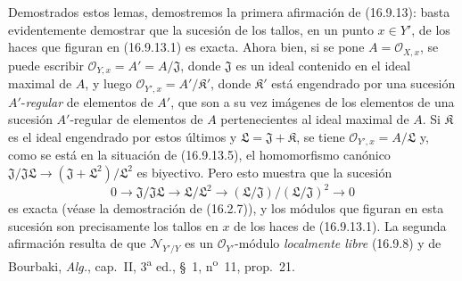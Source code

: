 Demostrados estos lemas, demostremos la primera afirmación de (16.9.13): basta
evidentemente demostrar que la sucesión de los tallos, en un punto $x\in Y'$,
de los haces que figuran en (16.9.13.1) es exacta. Ahora bien, si se pone
$A=\mathcal{O}_{X,x}$, se puede escribir
$\mathcal{O}_{Y,x}=A'=A/\mathfrak{J}$, donde $\mathfrak{J}$ es un ideal
contenido en el ideal maximal de $A$, y luego
$\mathcal{O}_{Y',x}=A'/\mathfrak{K}'$, donde $\mathfrak{K}'$ está engendrado
por una sucesión $A'$-\emph{regular} de elementos de $A'$, que son a su vez imágenes
de los elementos de una sucesión $A'$-regular de elementos de $A$
pertenecientes al ideal maximal de $A$. Si $\mathfrak{K}$ es el ideal
engendrado por estos últimos y $\mathfrak{L}=\mathfrak{J}+\mathfrak{K}$, se
tiene $\mathcal{O}_{Y',x}=A/\mathfrak{L}$ y, como se está en la situación de
(16.9.13.5), el homomorfismo canónico
$\mathfrak{J}/\mathfrak{J}\mathfrak{L}\to(\mathfrak{J}+\mathfrak{L}^2)/\mathfrak{L}^2$
es biyectivo. Pero esto muestra que la sucesión
\[
  0\longrightarrow\mathfrak{J}/\mathfrak{J}\mathfrak{L}
  \longrightarrow\mathfrak{L}/\mathfrak{L}^2
  \longrightarrow(\mathfrak{L}/\mathfrak{J})/
    (\mathfrak{L}/\mathfrak{J})^2\longrightarrow0
\]
es exacta (véase la demostración de (16.2.7)), y los módulos que figuran en
esta sucesión son precisamente los tallos en $x$ de los haces de (16.9.13.1).
La segunda afirmación resulta de que $\mathcal{N}_{Y'/Y}$ es un
$\mathcal{O}_{Y'}$-módulo \emph{localmente libre} (16.9.8) y de Bourbaki,
\emph{Alg.}, cap.~II, 3\textsuperscript{a} ed., §~1, n\textsuperscript{o}~11,
prop.~21.

